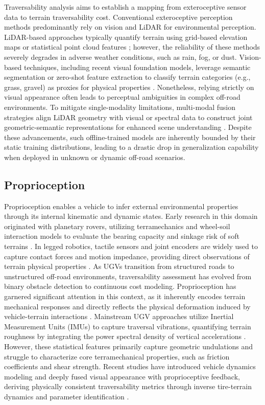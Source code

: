 \documentclass[letterpaper, 10 pt, conference]{ieeeconf}  %
\begin{document}
Traversability analysis aims to establish a mapping from exteroceptive sensor data to terrain traversability cost. Conventional exteroceptive perception methods predominantly rely on vision and LiDAR for environmental perception. LiDAR-based approaches typically quantify terrain using grid-based elevation maps or statistical point cloud features \cite{c12, c13, c14}; however, the reliability of these methods severely degrades in adverse weather conditions, such as rain, fog, or dust. Vision-based techniques, including recent visual foundation models, leverage semantic segmentation or zero-shot feature extraction to classify terrain categories (e.g., grass, gravel) as proxies for physical properties \cite{c15, c16, c17, c18}. Nonetheless, relying strictly on visual appearance often leads to perceptual ambiguities in complex off-road environments. To mitigate single-modality limitations, multi-modal fusion strategies align LiDAR geometry with visual or spectral data to construct joint geometric-semantic representations for enhanced scene understanding \cite{c19, c20, c21}. Despite these advancements, such offline-trained models are inherently bounded by their static training distributions, leading to a drastic drop in generalization capability when deployed in unknown or dynamic off-road scenarios.

\subsection{Proprioception}

Proprioception enables a vehicle to infer external environmental properties through its internal kinematic and dynamic states. Early research in this domain originated with planetary rovers, utilizing terramechanics and wheel-soil interaction models to evaluate the bearing capacity and sinkage risk of soft terrains \cite{c22, c23}. In legged robotics, tactile sensors and joint encoders are widely used to capture contact forces and motion impedance, providing direct observations of terrain physical properties \cite{c24, c25, c26}. As UGVs transition from structured roads to unstructured off-road environments, traversability assessment has evolved from binary obstacle detection to continuous cost modeling. Proprioception has garnered significant attention in this context, as it inherently encodes terrain mechanical responses and directly reflects the physical deformation induced by vehicle-terrain interactions \cite{c27}. Mainstream UGV approaches utilize Inertial Measurement Units (IMUs) to capture traversal vibrations, quantifying terrain roughness by integrating the power spectral density of vertical accelerations \cite{c8, c9, c10, c28, c29, c30}. However, these statistical features primarily capture geometric undulations and struggle to characterize core terramechanical properties, such as friction coefficients and shear strength. Recent studies have introduced vehicle dynamics modeling and deeply fused visual appearance with proprioceptive feedback, deriving physically consistent traversability metrics through inverse tire-terrain dynamics and parameter identification \cite{c7, c31, c32}.
\end{document}
